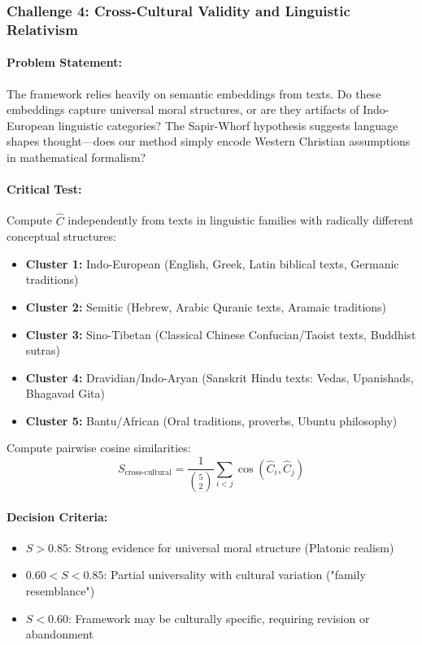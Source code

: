 \documentclass[11pt,a4paper]{article}
\theoremstyle{definition}
\theoremstyle{remark}
\begin{document}
\begin{small}
\subsubsection{Challenge 4: Cross-Cultural Validity and Linguistic Relativism}

\paragraph{Problem Statement:} 
The framework relies heavily on semantic embeddings from texts. Do these embeddings capture universal moral structures, or are they artifacts of Indo-European linguistic categories? The Sapir-Whorf hypothesis suggests language shapes thought—does our method simply encode Western Christian assumptions in mathematical formalism?

\paragraph{Critical Test:} 
Compute \(\hat{C}\) independently from texts in linguistic families with radically different conceptual structures:
\begin{itemize}
    \item \textbf{Cluster 1:} Indo-European (English, Greek, Latin biblical texts, Germanic traditions)
    \item \textbf{Cluster 2:} Semitic (Hebrew, Arabic Quranic texts, Aramaic traditions)
    \item \textbf{Cluster 3:} Sino-Tibetan (Classical Chinese Confucian/Taoist texts, Buddhist sutras)
    \item \textbf{Cluster 4:} Dravidian/Indo-Aryan (Sanskrit Hindu texts: Vedas, Upanishads, Bhagavad Gita)
    \item \textbf{Cluster 5:} Bantu/African (Oral traditions, proverbs, Ubuntu philosophy)
\end{itemize}

Compute pairwise cosine similarities:
\begin{equation}
S_{\text{cross-cultural}} = \frac{1}{\binom{5}{2}} \sum_{i < j} \cos(\hat{C}_i, \hat{C}_j)
\end{equation}

\paragraph{Decision Criteria:}
\begin{itemize}
    \item \(S > 0.85\): Strong evidence for universal moral structure (Platonic realism)
    \item \(0.60 < S < 0.85\): Partial universality with cultural variation ("family resemblance")
    \item \(S < 0.60\): Framework may be culturally specific, requiring revision or abandonment
\end{itemize}


\end{small}
\end{document}

